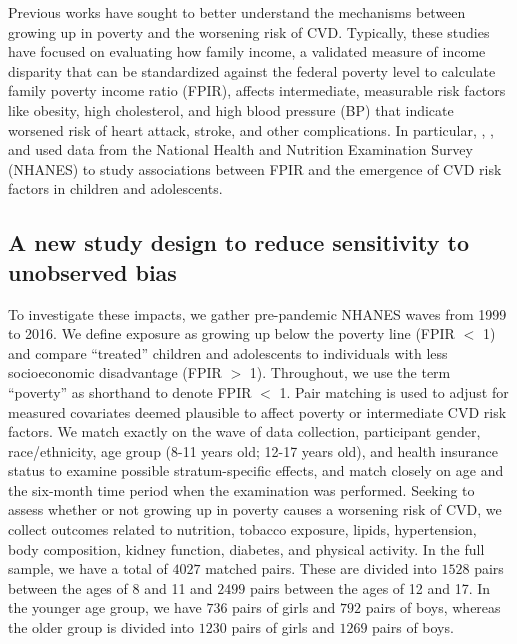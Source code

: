 \documentclass[12pt,leqno,titlepage]{amsart}
\newcommand{\1}{\mathbbm{1}}
\begin{document}
\begin{bibunit}
Previous works have sought to better understand the mechanisms between growing up in poverty and the worsening risk of CVD. Typically, these studies have focused on evaluating how family income, a validated measure of income disparity that can be standardized against the federal poverty level to calculate family poverty income ratio (FPIR), affects intermediate, measurable risk factors like obesity, high cholesterol, and high blood pressure (BP) that indicate worsened risk of heart attack, stroke, and other complications. In particular, \cite{ali2011household}, \cite{jackson2018income}, and \cite{connolly2022social} used data from the National Health and Nutrition Examination Survey (NHANES) to study associations between FPIR and the emergence of CVD risk factors in children and adolescents.



\subsection{A new study design to reduce sensitivity to unobserved bias}

To investigate these impacts, we gather pre-pandemic NHANES waves from 1999 to 2016. We define exposure as growing up below the poverty line (FPIR $<$ 1) and compare ``treated'' children and adolescents to individuals with less socioeconomic disadvantage (FPIR $>$ 1). Throughout, we use the term ``poverty'' as shorthand to denote FPIR $<$ 1. Pair matching is used to adjust for measured covariates deemed plausible to affect poverty or intermediate CVD risk factors. We match exactly on the wave of data collection, participant gender, race/ethnicity, age group (8-11 years old; 12-17 years old), and health insurance status to examine possible stratum-specific effects, and match closely on age and the six-month time period when the examination was performed. Seeking to assess whether or not growing up in poverty causes a worsening risk of CVD, we collect outcomes related to nutrition, tobacco exposure, lipids, hypertension, body composition, kidney function, diabetes, and physical activity. In the full sample, we have a total of $4027$ matched pairs. These are divided into $1528$ pairs between the ages of 8 and 11 and $2499$ pairs between the ages of 12 and 17. In the younger age group, we have $736$ pairs of girls and $792$ pairs of boys, whereas the older group is divided into $1230$ pairs of girls and $1269$ pairs of boys. 


\end{bibunit}
\end{document}
